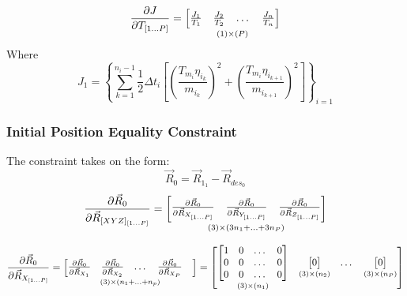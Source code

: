 \begin{equation}
\pdv{J}{T_{[1 ... P]}} = 
\underset{(1) \times (P)}{
\begin{bmatrix}
\frac{J_1}{T_1} &
\frac{J_2}{T_2} &
\dots &
\frac{J_n}{T_n}
\end{bmatrix}
}
\end{equation}
Where
\begin{equation}
J_1 = \left\{
\sum_{k=1}^{n_i-1} \frac{1}{2} \Delta t_i   
\left[
\left(
\frac{T_{m_i} \eta_{i_k}}{m_{i_k}}
\right)^2 + 
\left(
\frac{T_{m_i} \eta_{i_{k+1}}}{m_{i_{k+1}}}
\right)^2
\right]
\right\}_{i=1}
\end{equation}

\newpage
\subsubsection{Initial Position Equality Constraint}
The constraint takes on the form:
\begin{equation}
\vec{R}_0 = \vec{R}_{1_1} - \vec{R}_{des_0}
\end{equation}
\begin{equation}
\pdv{\vec{R}_0}{\vec{R}_{[XYZ]_{[1 ... P]}}} = 
\underset{(3) \times (3 n_1 + ... + 3 n_P)}{ 
\begin{bmatrix}
\pdv{\vec{R}_0}{\vec{R}_{X_{[1 ... P]}}} & 
\pdv{\vec{R}_0}{\vec{R}_{Y_{[1 ... P]}}} & 
\pdv{\vec{R}_0}{\vec{R}_{Z_{[1 ... P]}}} 
\end{bmatrix} }
\end{equation}

\begin{equation}
\pdv{\vec{R}_0}{\vec{R}_{X_{[1 ... P]}}} = 
\underset{(3) \times (n_1 + ... + n_p)}{
\begin{bmatrix}
\pdv{\vec{R}_0}{\vec{R}_{X_1}} &
\pdv{\vec{R}_0}{\vec{R}_{X_2}} &
\dots &
\pdv{\vec{R}_0}{\vec{R}_{X_P}} &
\end{bmatrix}
} = 
\begin{bmatrix}
\underset{(3) \times (n_1)}{
\begin{bmatrix}
1 & 0 & \dots & 0 \\
0 & 0 & \dots & 0 \\
0 & 0 & \dots & 0
\end{bmatrix}
} & 
\underset{(3) \times (n_2)}{
\begin{bmatrix}
0
\end{bmatrix}
} &
\dots &
\underset{(3) \times (n_P)}{
\begin{bmatrix}
0
\end{bmatrix}
}
\end{bmatrix}
\end{equation}

